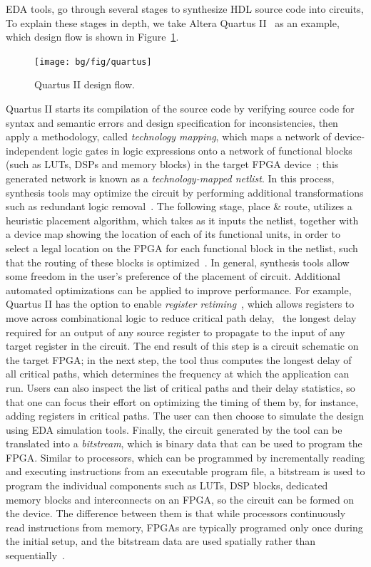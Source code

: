 EDA tools, go through several stages to synthesize HDL source code
into circuits, To explain these stages in depth, we take Altera
Quartus II~\cite{quartus} as an example, which design flow is shown in
Figure~\ref{fig:quartus}.
\begin{figure}[ht]
    \centering
    \texttt{[image: bg/fig/quartus]}
    \caption{Quartus II design flow.}\label{fig:quartus}
\end{figure}

Quartus II starts its compilation of the source code by verifying source code
for syntax and semantic errors and design specification for inconsistencies,
then apply a methodology, called \emph{technology mapping}, which maps
a network of device-independent logic gates in logic expressions onto a
network of functional blocks (such as LUTs, DSPs and memory blocks) in
the target FPGA device~\cite{cong08}; this generated network is known as
a \emph{technology-mapped netlist}.  In this process, synthesis tools may
optimize the circuit by performing additional transformations such as redundant
logic removal~\cite{quartus}.  The following stage, place \& route, utilizes a
heuristic placement algorithm, which takes as it inputs the netlist, together
with a device map showing the location of each of its functional units, in
order to select a legal location on the FPGA for each functional block in the
netlist, such that the routing of these blocks is optimized~\cite{betz08}.
In general, synthesis tools allow some freedom in the user's preference of
the placement of circuit.  Additional automated optimizations can be applied
to improve performance.  For example, Quartus II has the option to enable
\emph{register retiming}~\cite{quartus}, which allows registers to move across
combinational logic to reduce critical path delay, \ie~the longest delay
required for an output of any source register to propagate to the input of
any target register in the circuit.  The end result of this step is a circuit
schematic on the target FPGA\@; in the next step, the tool thus computes
the longest delay of all critical paths, which determines the frequency at
which the application can run.  Users can also inspect the list of critical
paths and their delay statistics, so that one can focus their effort on
optimizing the timing of them by, for instance, adding registers in critical
paths.  The user can then choose to simulate the design using EDA simulation
tools.  Finally, the circuit generated by the tool can be translated into a
\emph{bitstream}, which is binary data that can be used to program the FPGA\@.
Similar to processors, which can be programmed by incrementally reading and
executing instructions from an executable program file, a bitstream is used
to program the individual components such as LUTs, DSP blocks, dedicated
memory blocks and interconnects on an FPGA, so the circuit can be formed on
the device.  The difference between them is that while processors continuously
read instructions from memory, FPGAs are typically programed only once during
the initial setup, and the bitstream data are used spatially rather than
sequentially~\cite{guccione08}.
